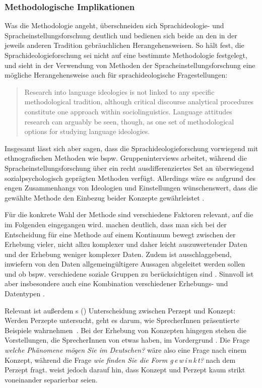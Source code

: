 \subsubsection{Methodologische Implikationen}
\label{sec:Methodologie}
Was die Methodologie angeht, überschneiden sich Sprachideologie- und Spracheinstellungsforschung deutlich und bedienen sich beide an den in der jeweils anderen Tradition gebräuchlichen Herangehensweisen. 
So hält \citet{Garrett.2012} fest, die Sprachideologieforschung sei nicht auf eine bestimmte Methodologie festgelegt, und sieht in der Verwendung von Methoden der Spracheinstellungsforschung eine mögliche Herangehensweise auch für sprachideologische Fragestellungen: 
\begin{quote}Research into language ideologies is not linked to any specific methodological tradition, although critical discourse analytical procedures constitute one approach within sociolinguistics. Language attitudes research can arguably be seen, though, as one set of methodological options for studying language ideologies.~\citep[35]{Garrett.2012}\end{quote}
Insgesamt lässt sich aber sagen, dass die Sprachideologieforschung vorwiegend mit ethnografischen Methoden wie bspw. Gruppeninterviews arbeitet, während die Spracheinstellungsforschung über ein recht ausdifferenziertes Set an überwiegend {so\-zial\-psycho\-lo\-gisch} geprägten Methoden verfügt. 
Allerdings wäre es aufgrund des engen Zusammenhangs von Ideologien und Einstellungen wünschenswert, dass die gewählte Methode den Einbezug beider Konzepte gewährleistet \citep[s.][196]{Liebscher.2009}.

Für die konkrete Wahl der Methode sind verschiedene Faktoren relevant, auf die im Folgenden eingegangen wird.
\citet[64]{Adler.2018} machen deutlich, dass man sich bei der Entscheidung für eine Methode auf einem Kontinuum bewegt zwischen der Erhebung vieler, nicht allzu komplexer und daher leicht auszuwertender Daten und der Erhebung weniger komplexer Daten. 
Zudem ist ausschlaggebend, inwiefern von den Daten allgemeingültigere Aussagen abgeleitet werden sollen und ob bspw. verschiedene soziale Gruppen zu berücksichtigen sind \citep[s.][64]{Adler.2018}. 
Sinnvoll ist aber insbesondere auch eine Kombination verschiedener Erhebungs- und Datentypen \citep[s.][144--145]{Soukup.2014}.

Relevant ist außerdem \citeauthor{Preston2010b}s (\citeyear{Preston2010b}) Unterscheidung zwischen Perzept und Konzept: Werden Perzepte untersucht, geht es darum, wie SprecherInnen pr{\"a}sentierte Beispiele wahrnehmen~\citep[1--2]{Preston2010b}. 
Bei der Erhebung von Konzepten hingegen stehen die Vorstellungen, die SprecherInnen von etwas haben, im Vordergrund \citep[1]{Preston2010b}. 
Die Frage \textit{welche Phänomene mögen Sie im Deutschen?} wäre also eine Frage nach einem Konzept, während die Frage \textit{wie finden Sie die Form g\,e\,w\,i\,n\,k\,t?} nach dem Perzept fragt. 
\citet[2--3]{Preston2010b} weist jedoch darauf hin, dass Konzept und Perzept kaum strikt voneinander separierbar seien.

